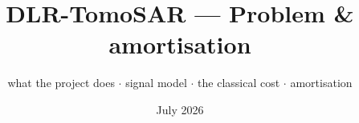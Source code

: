 \documentclass[aspectratio=169,9pt]{beamer}
\title{\textbf{DLR-TomoSAR --- Problem \& amortisation}}
\subtitle{what the project does \; $\cdot$ \; signal model \; $\cdot$ \; the classical cost \; $\cdot$ \; amortisation}
\date{\small July 2026}
\author{}
\begin{document}
\begin{frame}[plain]
  \titlepage
\end{frame}



\end{document}
